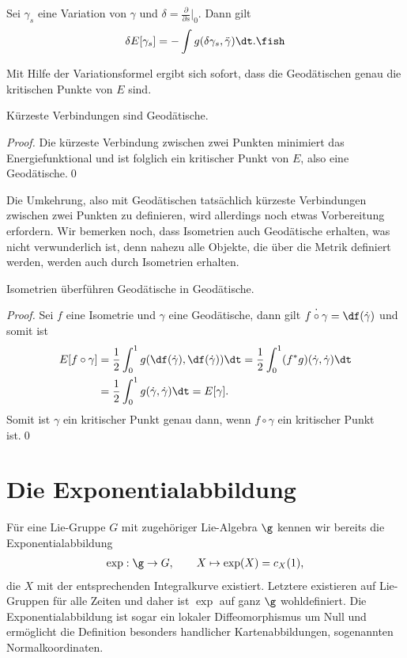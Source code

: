 \documentclass[%
	paper=a5,%
	fleqn,%
	DIV=18,%
	BCOR=0mm,
	fontsize=11pt,
	titlepage=false,%
	bibliography=totoc,
	DIV=18,%
	twoside=true,
	pdftitle=Riemannsche Geometrie,
	pdfauthor=Uwe Semmelmann,
	numbers=noendperiod]%
	{scrbook}
\begin{document}
\begin{prop}[Variationsformel]
Sei $\gamma_{s}$ eine Variation von $\gamma$ und $\delta = \frac{\partial}{\partial s}\big|_{0}$. Dann gilt
\begin{align*}
\delta E[\gamma_{s}] = -\int g(\delta \gamma_{s},\ddot\gamma)\dt.\fish
\end{align*}
\end{prop}

Mit Hilfe der Variationsformel ergibt sich sofort, dass die Geodätischen genau die kritischen Punkte von $E$ sind.

\begin{cor}
Kürzeste Verbindungen sind Geodätische.\fish
\end{cor}
\begin{proof}
Die kürzeste Verbindung zwischen zwei Punkten minimiert das Energiefunktional und ist folglich ein kritischer Punkt von $E$, also eine Geodätische.\qed
\end{proof}

Die Umkehrung, also mit Geodätischen tatsächlich kürzeste Verbindungen zwischen zwei Punkten zu definieren, wird allerdings noch etwas Vorbereitung erfordern. Wir bemerken noch, dass Isometrien auch Geodätische erhalten, was nicht verwunderlich ist, denn nahezu alle Objekte, die über die Metrik definiert werden, werden auch durch Isometrien erhalten.

\begin{cor}
Isometrien überführen Geodätische in Geodätische.\fish
\end{cor}
\begin{proof}
Sei $f$ eine Isometrie und $\gamma$ eine Geodätische, dann gilt $\dot{f\circ \gamma} = \df(\dot{\gamma})$ und somit ist
\begin{align*}
E[f\circ \gamma] &= \frac{1}{2}\int_{0}^1 g(\df(\dot\gamma),\df(\dot\gamma))\dt
= \frac{1}{2}\int_{0}^1 (f^*g)(\dot\gamma,\dot\gamma)\dt\\
&= \frac{1}{2}\int_{0}^1 g(\dot\gamma,\dot\gamma)\dt
= E[\gamma].
\end{align*}
Somit ist $\gamma$ ein kritischer Punkt genau dann, wenn $f\circ\gamma$ ein kritischer Punkt ist.\qed
\end{proof}


\section{Die Exponentialabbildung}

Für eine Lie-Gruppe $G$ mit zugehöriger Lie-Algebra $\g$ kennen wir bereits die
Exponentialabbildung
\begin{align*}
\exp: \g \to G,\qquad X\mapsto \exp(X) = c_X(1),
\end{align*}
die $X$ mit der entsprechenden Integralkurve existiert. Letztere existieren auf Lie-Gruppen für
alle Zeiten und daher ist $\exp$ auf ganz $\g$ wohldefiniert. Die Exponentialabbildung ist
sogar ein lokaler Diffeomorphismus um Null und ermöglicht die Definition
besonders handlicher Kartenabbildungen, sogenannten Normalkoordinaten.
\end{document}
